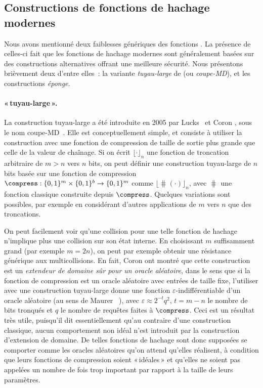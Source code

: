 \subsection{Constructions de fonctions de hachage modernes}
\label{sec:fbetter}

Nous avons mentionné deux faiblesses génériques des fonctions \merkdam. La présence de celles-ci fait que les fonctions de hachage modernes sont généralement
basées sur des constructions alternatives offrant une meilleure sécurité. Nous présentons brièvement deux d'entre elles~: la
variante \emph{tuyau-large} de \merkdam (ou \emph{coupe-MD}), et les constructions \emph{éponge}. 


\paragraph{\merkdam «\,tuyau-large\,».}
La construction tuyau-large a été introduite en 2005 par Lucks~\cite{DBLP:conf/asiacrypt/Lucks05}
et Coron \etal, sous le nom coupe-MD~\cite{DBLP:conf/crypto/CoronDMP05}.
Elle est conceptuellement simple, et consiste à utiliser la construction \merkdam avec une fonction de compression de taille de sortie plus grande que celle de la valeur de chaînage.
Si on écrit
$\lfloor\cdot\rfloor_n$
une fonction de troncation arbitraire de $m > n$ vers $n$ bits, on peut définir
une construction tuyau-large de $n$ bits basée sur une fonction de compression $\compress : \{0,1\}^m \times \{0,1\}^b \rightarrow \{0,1\}^m$
comme $\lfloor\hash(\cdot)\rfloor_n$, avec $\hash$ une fonction \merkdam classique construite depuis $\compress$.
Quelques variations sont possibles, par exemple en considérant d'autres applications de $m$ vers $n$ que des troncations.

On peut facilement voir qu'une collision pour une telle fonction de hachage n'implique plus une collision sur son état interne.
En choisissant $m$ suffisamment grand (par exemple $m = 2n$),
on peut par exemple obtenir une résistance générique aux multicollisions. En fait,
Coron \etal ont montré que cette construction est un \emph{extendeur de domaine sûr pour un oracle aléatoire}, dans le sens
que si la fonction de compression est un oracle aléatoire avec entrées de taille fixe, l'utiliser avec une construction tuyau-large donne une fonction
$\varepsilon$-indifférentiable d'un oracle aléatoire
(au sens de Maurer \etal~\cite{DBLP:conf/tcc/MaurerRH04}), avec
$\varepsilon \approx 2^{-t}q^2$, $t = m - n$ le nombre de bits tronqués et $q$ le nombre de requêtes faites à $\compress$.
Ceci est un résultat très utile, puisqu'il dit essentiellement qu'au contraire d'une construction \merkdam classique, aucun comportement non idéal
n'est introduit par la construction d'extension de domaine. De telles fonctions de hachage sont donc supposées se comporter comme les oracles aléatoires
qu'on attend qu'elles réalisent, à condition que leurs fonctions de compression soient «\,idéales\,» et qu'elles ne soient
pas appelées un nombre de fois trop important par rapport à la taille de leurs paramètres.


